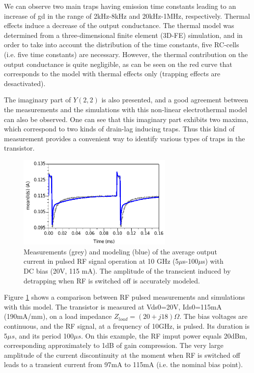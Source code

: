 \documentclass[conference]{IEEEtran}
\begin{document}
We can observe two main traps having emission time constants leading to an increase of gd in the range of 2kHz-8kHz and 20kHz-1MHz, respectively. Thermal effects induce a decrease of the output conductance. The thermal model was determined from a three-dimensional finite element (3D-FE) simulation, and in order to take into account the distribution of the time constants, five RC-cells (i.e. five time constants) are necessary. However, the thermal contribution on the output conductance is quite negligible, as can be seen on the red curve that corresponds to the model with thermal effects only (trapping effects are desactivated).

The imaginary part of $Y(2,2)$ is also presented, and a good agreement between the measurements and the simulations with this non-linear electrothermal model can also be observed. One can see that this imaginary part exhibits two maxima, which correspond to two kinds of drain-lag inducing traps. Thus this kind of measurement provides a convenient way to identify various types of traps in the transistor.

\begin{figure}[ht!] %
    \centering
    \includegraphics[width=3.0in]{Compare_pulse.pdf}
    \caption{Measurements (grey) and modeling (blue) of the average output current in pulsed RF signal operation at 10 GHz (5$\mu$s-100$\mu$s) with DC bias (20V, 115 mA). The amplitude of the transcient induced by detrapping when RF is switched off is accurately modeled.}
    \label{Compare_pulse}
\end{figure}

Figure \ref{Compare_pulse} shows a comparison between RF pulsed measurements and simulations with this model. The transistor is measured at Vds0=20V, Ids0=115mA (190mA/mm), on a load impedance $Z_{load}=\left(20+j18\right)\Omega$. The bias voltages are continuous, and the RF signal, at a frequency of 10GHz, is pulsed. Its duration is 5$\mu s$, and its period 100$\mu s$. On this example, the RF imput power equals 20dBm, corresponding approximately to 1dB of gain compression. The very large amplitude of the current discontinuity at the moment when RF is switched off leads to a transient current from 97mA to 115mA (i.e. the nominal bias point).
\end{document}
